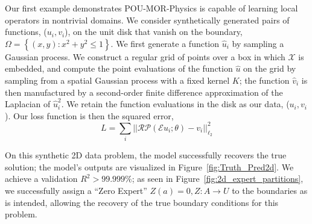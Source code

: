 Our first example demonstrates POU-MOR-Physics is capable of learning local operators in nontrivial domains. We consider synthetically generated pairs of functions, ($u_i,v_i$), on the unit disk that vanish on the boundary, $\Omega = \left\{(x,y):x^2+y^2\leq 1\right\}$. We first generate a function $\hat{u}_i$ by sampling a Gaussian process. We construct a regular grid of points over a box in which $\mathcal{X}$ is embedded, and compute the point evaluations of the function $\hat{u}$ on the grid by sampling from a spatial Gaussian process with a fixed kernel $K$; the function $\hat{v}_i$ is then manufactured by a second-order finite difference approximation of the Laplacian of $\hat{u}_i^2$. We retain the function evaluations in the disk as our data, ($u_i,v_i$).
Our loss function is then the squared error, 
\begin{equation}
    L = \sum_i || \mathcal{R}{\mathcal{P}}(\mathcal{E}{{u}}_i; \theta) - {v}_i||_{\ell_2}^2
\end{equation}

On this synthetic 2D data problem, the model successfully recovers the true solution; the model's outputs are visualized in Figure~\ref{fig:Truth_Pred2d}. We achieve a validation \(R^2>99.999\%\); as seen in Figure~\ref{fig:2d_expert_partitions}, we successfully assign a  ``Zero Expert'' \(Z(a)=0, Z: A \rightarrow U\) to the boundaries as is intended, allowing the recovery of the true boundary conditions for this problem.

